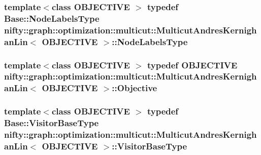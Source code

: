 \subsubsection[{Node\+Labels\+Type}]{\setlength{\rightskip}{0pt plus 5cm}template$<$class O\+B\+J\+E\+C\+T\+I\+V\+E $>$ typedef {\bf Base\+::\+Node\+Labels\+Type} {\bf nifty\+::graph\+::optimization\+::multicut\+::\+Multicut\+Andres\+Kernighan\+Lin}$<$ O\+B\+J\+E\+C\+T\+I\+V\+E $>$\+::{\bf Node\+Labels\+Type}}\label{classnifty_1_1graph_1_1optimization_1_1multicut_1_1MulticutAndresKernighanLin_a2c143d6b6e06a70388ba8a74d6b8d2ca}
\hypertarget{classnifty_1_1graph_1_1optimization_1_1multicut_1_1MulticutAndresKernighanLin_a97f5dee93f006373748000f85e918824}{}
\subsubsection[{Objective}]{\setlength{\rightskip}{0pt plus 5cm}template$<$class O\+B\+J\+E\+C\+T\+I\+V\+E $>$ typedef O\+B\+J\+E\+C\+T\+I\+V\+E {\bf nifty\+::graph\+::optimization\+::multicut\+::\+Multicut\+Andres\+Kernighan\+Lin}$<$ O\+B\+J\+E\+C\+T\+I\+V\+E $>$\+::{\bf Objective}}\label{classnifty_1_1graph_1_1optimization_1_1multicut_1_1MulticutAndresKernighanLin_a97f5dee93f006373748000f85e918824}
\hypertarget{classnifty_1_1graph_1_1optimization_1_1multicut_1_1MulticutAndresKernighanLin_aa9ff2451667fafb8a65092737bf63610}{}
\subsubsection[{Visitor\+Base\+Type}]{\setlength{\rightskip}{0pt plus 5cm}template$<$class O\+B\+J\+E\+C\+T\+I\+V\+E $>$ typedef {\bf Base\+::\+Visitor\+Base\+Type} {\bf nifty\+::graph\+::optimization\+::multicut\+::\+Multicut\+Andres\+Kernighan\+Lin}$<$ O\+B\+J\+E\+C\+T\+I\+V\+E $>$\+::{\bf Visitor\+Base\+Type}}\label{classnifty_1_1graph_1_1optimization_1_1multicut_1_1MulticutAndresKernighanLin_aa9ff2451667fafb8a65092737bf63610}


